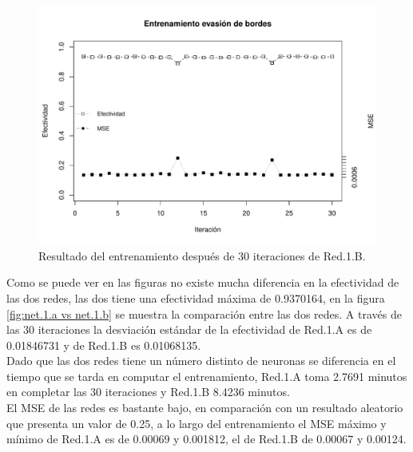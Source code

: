 \documentclass{iccmemoria}
\begin{document}
\begin{figure}
  \centering
  \includegraphics[width = 450pt]{images/plot_net_1_b.pdf}
  \caption[Entrenamiento primera etapa Red.1.B.]{Resultado del entrenamiento después de 30 iteraciones de Red.1.B.}
  \label{fig:net.1.b}
\end{figure}

Como se puede ver en las figuras no existe mucha diferencia en la efectividad de las dos redes, las dos tiene una efectividad máxima de 0.9370164, en la figura \ref{fig:net.1.a vs net.1.b} se muestra la comparación entre las dos redes. A través de las 30 iteraciones la desviación estándar de la efectividad de Red.1.A es de 0.01846731 y de Red.1.B es 0.01068135.\\

Dado que las dos redes tiene un número distinto de neuronas se diferencia en el tiempo que se tarda en computar el entrenamiento, Red.1.A toma 2.7691 minutos en completar las 30 iteraciones y Red.1.B 8.4236 minutos.\\

El MSE de las redes es bastante bajo, en comparación con un resultado aleatorio que presenta un valor de 0.25, a lo largo del entrenamiento el MSE máximo y mínimo de Red.1.A es de 0.00069 y 0.001812, el de Red.1.B de 0.00067 y 0.00124.\\
\end{document}
